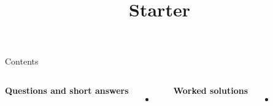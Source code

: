 \documentclass{beamer}
\title{Starter}
\date{}
\begin{document}
\frame{\titlepage}

\begin{frame}{Contents}
\small
\begin{columns}[T]

\textbf{Questions and short answers}
\begin{itemize}
  \item \hyperlink{q-st1}{}
\end{itemize}

\textbf{Worked solutions}
\begin{itemize}
  \item \hyperlink{work-st1}{}
\end{itemize}

\end{columns}
\end{frame}

\end{document}
